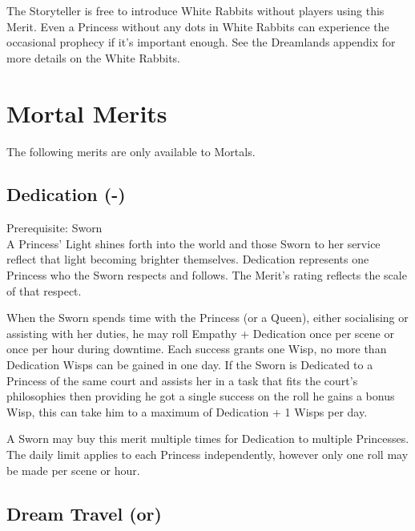 The Storyteller is free to introduce White Rabbits without players using this Merit. Even a Princess without any dots in White Rabbits can experience the occasional prophecy if it's important enough. See the Dreamlands appendix for more details on the White Rabbits.


\section*{Mortal Merits}

The following merits are only available to Mortals. 

\subsection*{Dedication (\textbullet\nobreak\hspace{.16667em}-\nobreak\hspace{.16667em}\textbullet\textbullet\textbullet\textbullet\textbullet)}

Prerequisite: Sworn \\

\noindent A Princess' Light shines forth into the world and those Sworn to her service reflect that light becoming brighter themselves. Dedication represents one Princess who the Sworn respects and follows. The Merit's rating reflects the scale of that respect. 

When the Sworn spends time with the Princess (or a Queen), either socialising or assisting with her duties, he may roll Empathy + Dedication once per scene or once per hour during downtime. Each success grants one Wisp, no more than Dedication Wisps can be gained in one day. If the Sworn is Dedicated to a Princess of the same court and assists her in a task that fits the court's philosophies then providing he got a single success on the roll he gains a bonus Wisp, this can take him to a maximum of Dedication + 1 Wisps per day.

A Sworn may buy this merit multiple times for Dedication to multiple Princesses. The daily limit applies to each Princess independently, however only one roll may be made per scene or hour. 

\subsection*{Dream Travel (\textbullet\nobreak\hspace{.16667em}or\nobreak\hspace{.16667em}\textbullet\textbullet\textbullet)}

